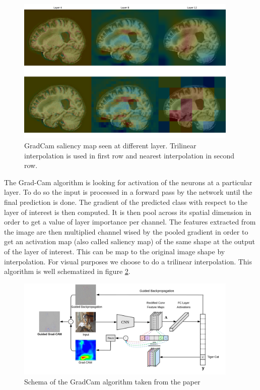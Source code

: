 \begin{figure}
    \centering
    \includegraphics[width=400]{figures/gradcam_multilayer.pdf}
    \caption{GradCam saliency map seen at different layer. Trilinear interpolation is used in first row and nearest interpolation in second row.}
    \label{fig:grad_cam_multilayer}
\end{figure}

The Grad-Cam\cite{grad_cam_2019} algorithm is looking for activation of the neurons at a particular layer. To do so the input is processed in a forward pass by the network until the final prediction is done. The gradient of the predicted class with respect to the layer of interest is then computed. It is then pool across its spatial dimension in order to get a value of layer importance per channel. The features extracted from the image are then multiplied channel wised by the pooled gradient in order to get an activation map (also called saliency map) of the same shape at the output of the layer of interest. This can be map to the original image shape by interpolation. For visual purposes we choose to do a trilinear interpolation. This algorithm is well schematized in figure \ref{fig:grad_cam_arch}.

\begin{figure}
    \centering
    \includegraphics[width=400]{figures/grad_cam_arch.jpeg}
    \caption{Schema of the GradCam algorithm taken from the paper\cite{grad_cam_2019}}
    \label{fig:grad_cam_arch}
\end{figure}

